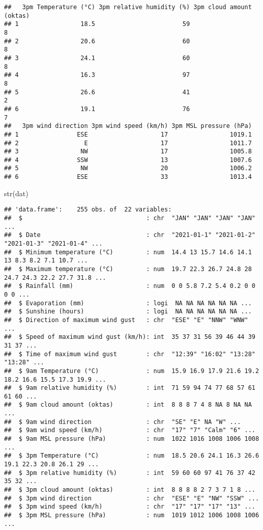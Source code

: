 \documentclass[
]{article}
\newenvironment{Shaded}{\begin{snugshade}}{\end{snugshade}}
\newcommand{\FunctionTok}[1]{\textcolor[rgb]{0.00,0.00,0.00}{#1}}
\newcommand{\NormalTok}[1]{#1}
\begin{document}
\begin{verbatim}
##   3pm Temperature (°C) 3pm relative humidity (%) 3pm cloud amount (oktas)
## 1                 18.5                        59                        8
## 2                 20.6                        60                        8
## 3                 24.1                        60                        8
## 4                 16.3                        97                        8
## 5                 26.6                        41                        2
## 6                 19.1                        76                        7
##   3pm wind direction 3pm wind speed (km/h) 3pm MSL pressure (hPa)
## 1                ESE                    17                 1019.1
## 2                  E                    17                 1011.7
## 3                 NW                    17                 1005.8
## 4                SSW                    13                 1007.6
## 5                 NW                    20                 1006.2
## 6                ESE                    33                 1013.4
\end{verbatim}

\begin{Shaded}
\begin{Highlighting}[]
\FunctionTok{str}\NormalTok{(dat)}
\end{Highlighting}
\end{Shaded}

\begin{verbatim}
## 'data.frame':    255 obs. of  22 variables:
##  $                                  : chr  "JAN" "JAN" "JAN" "JAN" ...
##  $ Date                             : chr  "2021-01-1" "2021-01-2" "2021-01-3" "2021-01-4" ...
##  $ Minimum temperature (°C)         : num  14.4 13 15.7 14.6 14.1 13 8.3 8.2 7.1 10.7 ...
##  $ Maximum temperature (°C)         : num  19.7 22.3 26.7 24.8 28 24.7 24.3 22.2 27.7 31.8 ...
##  $ Rainfall (mm)                    : num  0 0 5.8 7.2 5.4 0.2 0 0 0 0 ...
##  $ Evaporation (mm)                 : logi  NA NA NA NA NA NA ...
##  $ Sunshine (hours)                 : logi  NA NA NA NA NA NA ...
##  $ Direction of maximum wind gust   : chr  "ESE" "E" "NNW" "WNW" ...
##  $ Speed of maximum wind gust (km/h): int  35 37 31 56 39 46 44 39 31 37 ...
##  $ Time of maximum wind gust        : chr  "12:39" "16:02" "13:28" "13:28" ...
##  $ 9am Temperature (°C)             : num  15.9 16.9 17.9 21.6 19.2 18.2 16.6 15.5 17.3 19.9 ...
##  $ 9am relative humidity (%)        : int  71 59 94 74 77 68 57 61 61 60 ...
##  $ 9am cloud amount (oktas)         : int  8 8 8 7 4 8 NA 8 NA NA ...
##  $ 9am wind direction               : chr  "SE" "E" NA "W" ...
##  $ 9am wind speed (km/h)            : chr  "17" "7" "Calm" "6" ...
##  $ 9am MSL pressure (hPa)           : num  1022 1016 1008 1006 1008 ...
##  $ 3pm Temperature (°C)             : num  18.5 20.6 24.1 16.3 26.6 19.1 22.3 20.8 26.1 29 ...
##  $ 3pm relative humidity (%)        : int  59 60 60 97 41 76 37 42 35 32 ...
##  $ 3pm cloud amount (oktas)         : int  8 8 8 8 2 7 3 7 1 8 ...
##  $ 3pm wind direction               : chr  "ESE" "E" "NW" "SSW" ...
##  $ 3pm wind speed (km/h)            : chr  "17" "17" "17" "13" ...
##  $ 3pm MSL pressure (hPa)           : num  1019 1012 1006 1008 1006 ...
\end{verbatim}
\end{document}
